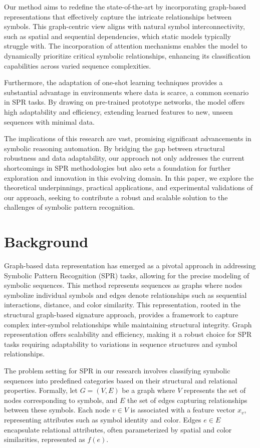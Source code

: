 \documentclass{article}
\begin{document}
Our method aims to redefine the state-of-the-art by incorporating graph-based representations that effectively capture the intricate relationships between symbols. This graph-centric view aligns with natural symbol interconnectivity, such as spatial and sequential dependencies, which static models typically struggle with. The incorporation of attention mechanisms enables the model to dynamically prioritize critical symbolic relationships, enhancing its classification capabilities across varied sequence complexities. 

Furthermore, the adaptation of one-shot learning techniques provides a substantial advantage in environments where data is scarce, a common scenario in SPR tasks. By drawing on pre-trained prototype networks, the model offers high adaptability and efficiency, extending learned features to new, unseen sequences with minimal data. 

The implications of this research are vast, promising significant advancements in symbolic reasoning automation. By bridging the gap between structural robustness and data adaptability, our approach not only addresses the current shortcomings in SPR methodologies but also sets a foundation for further exploration and innovation in this evolving domain. In this paper, we explore the theoretical underpinnings, practical applications, and experimental validations of our approach, seeking to contribute a robust and scalable solution to the challenges of symbolic pattern recognition.
\section{Background}
Graph-based data representation has emerged as a pivotal approach in addressing Symbolic Pattern Recognition (SPR) tasks, allowing for the precise modeling of symbolic sequences. This method represents sequences as graphs where nodes symbolize individual symbols and edges denote relationships such as sequential interactions, distance, and color similarity. This representation, rooted in the structural graph-based signature approach, provides a framework to capture complex inter-symbol relationships while maintaining structural integrity. Graph representation offers scalability and efficiency, making it a robust choice for SPR tasks requiring adaptability to variations in sequence structures and symbol relationships.

The problem setting for SPR in our research involves classifying symbolic sequences into predefined categories based on their structural and relational properties. Formally, let \( G = (V, E) \) be a graph where \( V \) represents the set of nodes corresponding to symbols, and \( E \) the set of edges capturing relationships between these symbols. Each node \( v \in V \) is associated with a feature vector \( x_v \), representing attributes such as symbol identity and color. Edges \( e \in E \) encapsulate relational attributes, often parameterized by spatial and color similarities, represented as \( f(e) \).
\end{document}
